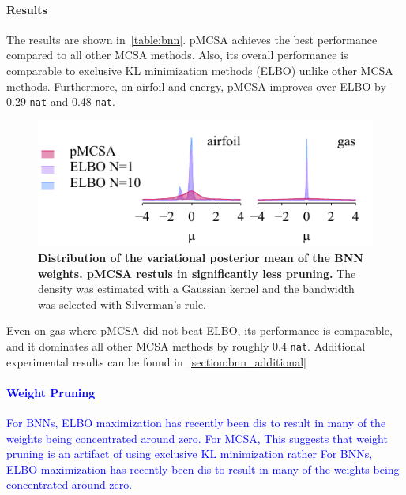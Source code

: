 \vspace{-0.1in}
\paragraph{Results}
The results are shown in~\cref{table:bnn}.
pMCSA achieves the best performance compared to all other MCSA methods.
Also, its overall performance is comparable to exclusive KL minimization methods (ELBO) unlike other MCSA methods.
Furthermore, on \textsf{airfoil} and \textsf{energy}, pMCSA improves over ELBO by 0.29 \texttt{nat} and 0.48 \texttt{nat}.
%
\begin{figure}
  \vspace{-4ex}
  \centering
  \includegraphics[scale=0.9]{figures/pruning_01.pdf}
  \vspace{-2ex}
  \caption{\textbf{
      Distribution of the variational posterior mean of the BNN weights.
      pMCSA restuls in significantly less pruning.
    }
    The density was estimated with a Gaussian kernel and the bandwidth was selected with Silverman's rule.
  }\label{fig:gaussian}
\end{figure}
%
Even on \textsf{gas} where pMCSA did not beat ELBO, its performance is comparable, and it dominates all other MCSA methods by roughly 0.4 \texttt{nat}.
Additional experimental results can be found in~\cref{section:bnn_additional}

\vspace{-6ex}
\textcolor{blue}{
\paragraph{Weight Pruning}
For BNNs, ELBO maximization has recently been dis to result in many of the weights being concentrated around zero.
For MCSA, 
This suggests that weight pruning is an artifact of using exclusive KL minimization rather
For BNNs, ELBO maximization has recently been dis to result in many of the weights being concentrated around zero.
}

\vspace{-0.1in}
